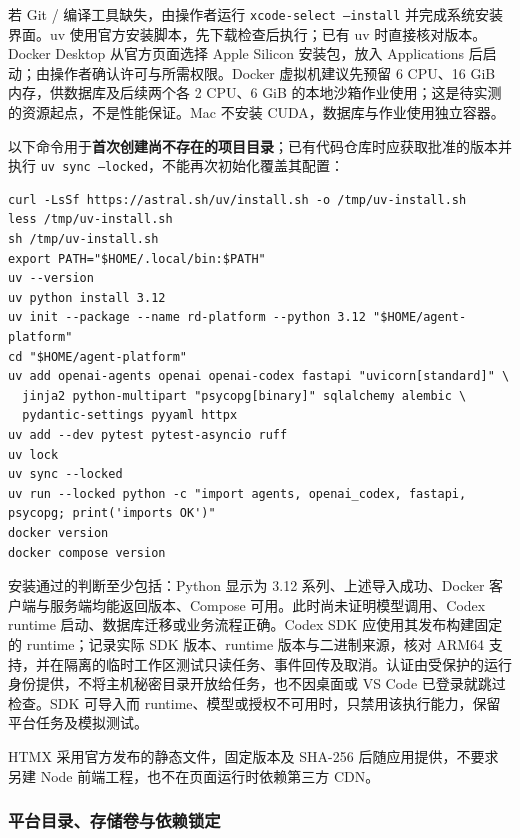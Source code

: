 \documentclass[11pt,a4paper]{article}
\begin{document}
若 Git / 编译工具缺失，由操作者运行 \texttt{xcode-select --install} 并完成系统安装界面。uv 使用官方安装脚本，先下载检查后执行；已有 uv 时直接核对版本。Docker Desktop 从官方页面选择 Apple Silicon 安装包，放入 Applications 后启动；由操作者确认许可与所需权限。Docker 虚拟机建议先预留 6 CPU、16 GiB 内存，供数据库及后续两个各 2 CPU、6 GiB 的本地沙箱作业使用；这是待实测的资源起点，不是性能保证。Mac 不安装 CUDA，数据库与作业使用独立容器。\cite{ch5-uv-project,ch5-docker-mac}

以下命令用于\textbf{首次创建尚不存在的项目目录}；已有代码仓库时应获取批准的版本并执行 \texttt{uv sync --locked}，不能再次初始化覆盖其配置：
\par\noindent\begin{minipage}{\linewidth}
\begin{lstlisting}
curl -LsSf https://astral.sh/uv/install.sh -o /tmp/uv-install.sh
less /tmp/uv-install.sh
sh /tmp/uv-install.sh
export PATH="$HOME/.local/bin:$PATH"
uv --version
uv python install 3.12
uv init --package --name rd-platform --python 3.12 "$HOME/agent-platform"
cd "$HOME/agent-platform"
uv add openai-agents openai openai-codex fastapi "uvicorn[standard]" \
  jinja2 python-multipart "psycopg[binary]" sqlalchemy alembic \
  pydantic-settings pyyaml httpx
uv add --dev pytest pytest-asyncio ruff
uv lock
uv sync --locked
uv run --locked python -c "import agents, openai_codex, fastapi, psycopg; print('imports OK')"
docker version
docker compose version
\end{lstlisting}
\end{minipage}\par


安装通过的判断至少包括：Python 显示为 3.12 系列、上述导入成功、Docker 客户端与服务端均能返回版本、Compose 可用。此时尚未证明模型调用、Codex runtime 启动、数据库迁移或业务流程正确。Codex SDK 应使用其发布构建固定的 runtime；记录实际 SDK 版本、runtime 版本与二进制来源，核对 ARM64 支持，并在隔离的临时工作区测试只读任务、事件回传及取消。认证由受保护的运行身份提供，不将主机秘密目录开放给任务，也不因桌面或 VS Code 已登录就跳过检查。SDK 可导入而 runtime、模型或授权不可用时，只禁用该执行能力，保留平台任务及模拟测试。\cite{codex-sdk,v121-codex-auth}

HTMX 采用官方发布的静态文件，固定版本及 SHA-256 后随应用提供，不要求另建 Node 前端工程，也不在页面运行时依赖第三方 CDN。

\subsubsection{平台目录、存储卷与依赖锁定}
\end{document}
